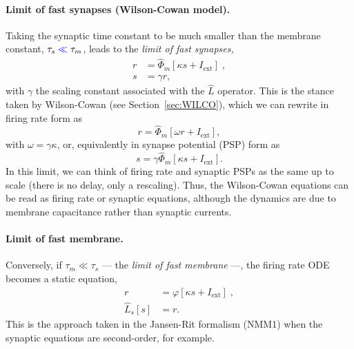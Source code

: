 \documentclass[12pt]{article}
\numberwithin{equation}{section}
\newcommand{\rev}[1]{\begingroup\color{blue}#1\endgroup}
\begin{document}
\paragraph{Limit of fast synapses (Wilson-Cowan model).} Taking the synaptic time constant to be much smaller than the membrane constant,  $\tau_s %
\rev{\ll} \tau_m$, leads to the \textit{limit of fast synapses, }
\begin{equation}\label{eq:wilco0}
\begin{aligned}
r &=  \hat \Phi_m [\kappa s +  I_\text{ext}] \;,\\
 s &= \gamma r,
 \end{aligned}
\end{equation}
with $\gamma$ the scaling constant associated with the $\hat L$ operator. This is the stance taken by Wilson-Cowan (see  Section~\ref{sec:WILCO}), which we can rewrite in firing rate form as 
\begin{equation}\label{eq:wilco0-op}
 r =  \hat \Phi_m [\omega r +  I_\text{ext}] ,
\end{equation}
with $\omega= \gamma \kappa$, or, equivalently in synapse potential (PSP) form as
\begin{equation}\label{eq:wilco0-op-s}
 s =  \gamma \hat \Phi_m [\kappa s +  I_\text{ext}].
\end{equation}
In this limit, we can think of firing rate and synaptic PSPs as the same up to scale (there is no delay, only a rescaling). Thus, the Wilson-Cowan equations can be read as firing rate or synaptic equations, although the dynamics are due to membrane capacitance rather than synaptic currents.


 \paragraph{Limit of fast membrane.} Conversely, if \rev{$\tau_m \ll \tau_s$} --- the \textit{limit of fast membrane} ---, the firing rate ODE becomes a static equation,
\begin{equation}
\begin{aligned}
 r  &=  \varphi[\kappa s +  I_\text{ext}] \;,\\
 \hat L_s[s] &=  r.
 \end{aligned}
\end{equation}
This is the approach taken in the Jansen-Rit formalism (NMM1) when the synaptic equations are second-order, for example.
\end{document}
